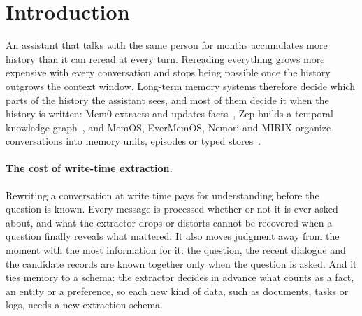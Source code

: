 \section{Introduction}
\label{sec:intro}

An assistant that talks with the same person for months accumulates more history than it can reread at every turn.
Rereading everything grows more expensive with every conversation and stops being possible once the history outgrows the context window.
Long-term memory systems therefore decide which parts of the history the assistant sees, and most of them decide it when the history is written: Mem0 extracts and updates facts~\citep{chhikara2025mem0}, Zep builds a temporal knowledge graph~\citep{rasmussen2025zep}, and MemOS, EverMemOS, Nemori and MIRIX organize conversations into memory units, episodes or typed stores~\citep{li2025memos,evermemos2026,nan2025nemori,wang2025mirix}.

\paragraph{The cost of write-time extraction.}
Rewriting a conversation at write time pays for understanding before the question is known.
Every message is processed whether or not it is ever asked about, and what the extractor drops or distorts cannot be recovered when a question finally reveals what mattered.
It also moves judgment away from the moment with the most information for it: the question, the recent dialogue and the candidate records are known together only when the question is asked.
And it ties memory to a schema: the extractor decides in advance what counts as a fact, an entity or a preference, so each new kind of data, such as documents, tasks or logs, needs a new extraction schema.

